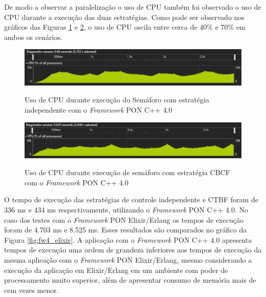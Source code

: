 De modo a observar a paralelização o uso de CPU também foi observado o uso de
CPU durante a execução das duas estratégias. Como pode ser observado nos
gráficos das Figuras \ref{fig:cpu_cta} e \ref{fig:cpu_cbcf}, o uso de CPU oscila
entre cerca de 40\% e 70\% em ambos os cenários.

\begin{figure}[!htb]
\centering
\caption{Uso de CPU durante execução do Semáforo com estratégia independente com
o \textit{Framework} PON C++ 4.0}
\smallskip
\includegraphics[width=\textwidth]{../figures/cta_cpu.png}
\label{fig:cpu_cta}
\end{figure}

\begin{figure}[!htb]
\centering
\caption{Uso de CPU durante execução de semáforo com estratégia CBCF com o
\textit{Framework} PON C++ 4.0}
\smallskip
\includegraphics[width=\textwidth]{../figures/cbcl_cpu.png}
\label{fig:cpu_cbcf}
\end{figure}
\FloatBarrier

O tempo de execução das estratégias de controle independente e CTBF foram de 336
ms e 434 ms respectivamente, utilizando o \textit{Framework} PON C++ 4.0. No
caso dos testes com o \textit{Framework} PON Elixir/Erlang os tempos de execução
foram de 4.703 ms e 8.525 ms. Esses resultados são comparados no gráfico da
Figura \ref{fig:fw4_elixir}. A aplicação com o \textit{Framework} PON C++ 4.0
apresenta tempos de execução uma ordem de grandeza inferiores aos tempos de
execução da mesma aplicação com o \textit{Framework} PON Elixir/Erlang, mesmo
considerando a execução da aplicação em Elixir/Erlang em um ambiente com poder
de processamento muito superior, além de apresentar consumo de memória mais de
cem vezes menor.

